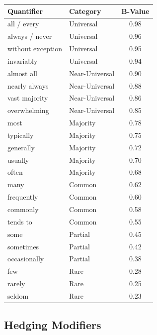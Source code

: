 \documentclass[11pt,a4paper]{article}
\begin{document}
\begin{center}
\begin{tabular}{llc}
\toprule
\textbf{Quantifier} & \textbf{Category} & \textbf{B-Value} \\
\midrule
all / every & Universal & 0.98 \\
always / never & Universal & 0.96 \\
without exception & Universal & 0.95 \\
invariably & Universal & 0.94 \\
almost all & Near-Universal & 0.90 \\
nearly always & Near-Universal & 0.88 \\
vast majority & Near-Universal & 0.86 \\
overwhelming & Near-Universal & 0.85 \\
most & Majority & 0.78 \\
typically & Majority & 0.75 \\
generally & Majority & 0.72 \\
usually & Majority & 0.70 \\
often & Majority & 0.68 \\
many & Common & 0.62 \\
frequently & Common & 0.60 \\
commonly & Common & 0.58 \\
tends to & Common & 0.55 \\
some & Partial & 0.45 \\
sometimes & Partial & 0.42 \\
occasionally & Partial & 0.38 \\
few & Rare & 0.28 \\
rarely & Rare & 0.25 \\
seldom & Rare & 0.23 \\
\bottomrule
\end{tabular}
\end{center}

\subsection{Hedging Modifiers}
\end{document}
